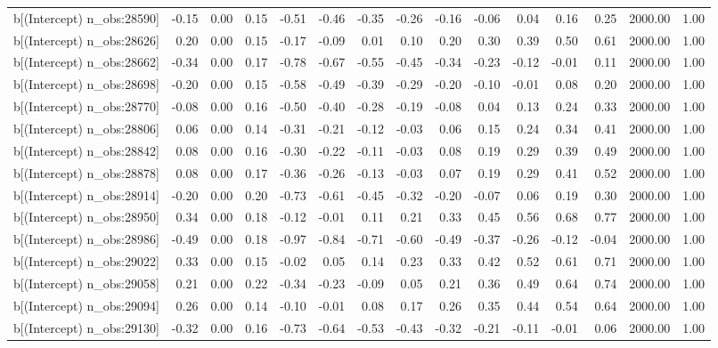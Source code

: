 \begin{table}[ht]
\begin{tabular}{rrrrrrrrrrrrrrr}
  b[(Intercept) n\_obs:28590] & -0.15 & 0.00 & 0.15 & -0.51 & -0.46 & -0.35 & -0.26 & -0.16 & -0.06 & 0.04 & 0.16 & 0.25 & 2000.00 & 1.00 \\ 
  b[(Intercept) n\_obs:28626] & 0.20 & 0.00 & 0.15 & -0.17 & -0.09 & 0.01 & 0.10 & 0.20 & 0.30 & 0.39 & 0.50 & 0.61 & 2000.00 & 1.00 \\ 
  b[(Intercept) n\_obs:28662] & -0.34 & 0.00 & 0.17 & -0.78 & -0.67 & -0.55 & -0.45 & -0.34 & -0.23 & -0.12 & -0.01 & 0.11 & 2000.00 & 1.00 \\ 
  b[(Intercept) n\_obs:28698] & -0.20 & 0.00 & 0.15 & -0.58 & -0.49 & -0.39 & -0.29 & -0.20 & -0.10 & -0.01 & 0.08 & 0.20 & 2000.00 & 1.00 \\ 
  b[(Intercept) n\_obs:28770] & -0.08 & 0.00 & 0.16 & -0.50 & -0.40 & -0.28 & -0.19 & -0.08 & 0.04 & 0.13 & 0.24 & 0.33 & 2000.00 & 1.00 \\ 
  b[(Intercept) n\_obs:28806] & 0.06 & 0.00 & 0.14 & -0.31 & -0.21 & -0.12 & -0.03 & 0.06 & 0.15 & 0.24 & 0.34 & 0.41 & 2000.00 & 1.00 \\ 
  b[(Intercept) n\_obs:28842] & 0.08 & 0.00 & 0.16 & -0.30 & -0.22 & -0.11 & -0.03 & 0.08 & 0.19 & 0.29 & 0.39 & 0.49 & 2000.00 & 1.00 \\ 
  b[(Intercept) n\_obs:28878] & 0.08 & 0.00 & 0.17 & -0.36 & -0.26 & -0.13 & -0.03 & 0.07 & 0.19 & 0.29 & 0.41 & 0.52 & 2000.00 & 1.00 \\ 
  b[(Intercept) n\_obs:28914] & -0.20 & 0.00 & 0.20 & -0.73 & -0.61 & -0.45 & -0.32 & -0.20 & -0.07 & 0.06 & 0.19 & 0.30 & 2000.00 & 1.00 \\ 
  b[(Intercept) n\_obs:28950] & 0.34 & 0.00 & 0.18 & -0.12 & -0.01 & 0.11 & 0.21 & 0.33 & 0.45 & 0.56 & 0.68 & 0.77 & 2000.00 & 1.00 \\ 
  b[(Intercept) n\_obs:28986] & -0.49 & 0.00 & 0.18 & -0.97 & -0.84 & -0.71 & -0.60 & -0.49 & -0.37 & -0.26 & -0.12 & -0.04 & 2000.00 & 1.00 \\ 
  b[(Intercept) n\_obs:29022] & 0.33 & 0.00 & 0.15 & -0.02 & 0.05 & 0.14 & 0.23 & 0.33 & 0.42 & 0.52 & 0.61 & 0.71 & 2000.00 & 1.00 \\ 
  b[(Intercept) n\_obs:29058] & 0.21 & 0.00 & 0.22 & -0.34 & -0.23 & -0.09 & 0.05 & 0.21 & 0.36 & 0.49 & 0.64 & 0.74 & 2000.00 & 1.00 \\ 
  b[(Intercept) n\_obs:29094] & 0.26 & 0.00 & 0.14 & -0.10 & -0.01 & 0.08 & 0.17 & 0.26 & 0.35 & 0.44 & 0.54 & 0.64 & 2000.00 & 1.00 \\ 
  b[(Intercept) n\_obs:29130] & -0.32 & 0.00 & 0.16 & -0.73 & -0.64 & -0.53 & -0.43 & -0.32 & -0.21 & -0.11 & -0.01 & 0.06 & 2000.00 & 1.00 \\ 

\end{tabular}
\end{table}
